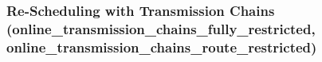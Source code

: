 \documentclass{article}
\begin{document}
%
%
%

\subsubsection{Re-Scheduling with Transmission Chains\\ (online\_transmission\_chains\_fully\_restricted,\\online\_transmission\_chains\_route\_restricted)}
\label{subsubsec:scope_online_tranmission_chains}
\end{document}
